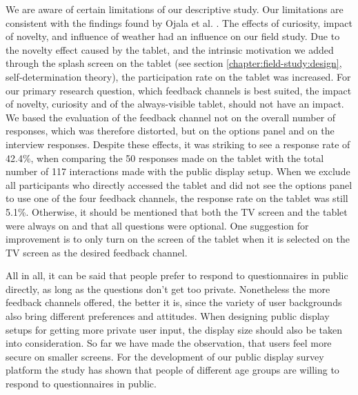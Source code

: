 


	We are aware of certain limitations of our descriptive study. Our limitations are consistent with the findings found by Ojala et al. \cite{Ojala2011}. The effects of curiosity, impact of novelty, and influence of weather had an influence on our field study. Due to the novelty effect caused by the tablet, and the intrinsic motivation we added through the splash screen on the tablet (see section \ref{chapter:field-study:design}, self-determination theory), the participation rate on the tablet was increased. For our primary research question, which feedback channels is best suited, the impact of novelty, curiosity and of the always-visible tablet, should not have an impact. We based the evaluation of the feedback channel not on the overall number of responses, which was therefore distorted, but on the options panel and on the interview responses.
	Despite these effects, it was striking to see a response rate of 42.4\%, when comparing the 50 responses made on the tablet with the total number of 117 interactions made with the public display setup. When we exclude all participants who directly accessed the tablet and did not see the options panel to use one of the four feedback channels, the response rate on the tablet was still 5.1\%. 
	Otherwise, it should be mentioned that both the TV screen and the tablet were always on and that all questions were optional. One suggestion for improvement is to only turn on the screen of the tablet when it is selected on the TV screen as the desired feedback channel.

	All in all, it can be said that people prefer to respond to questionnaires in public directly, as long as the questions don't get too private. Nonetheless the more feedback channels offered, the better it is, since the variety of user backgrounds also bring different preferences and attitudes. When designing public display setups for getting more private user input, the display size should also be taken into consideration. So far we have made the observation, that users feel more secure on smaller screens.
	For the development of our public display survey platform the study has shown that people of different age groups are willing to respond to questionnaires in public. 





